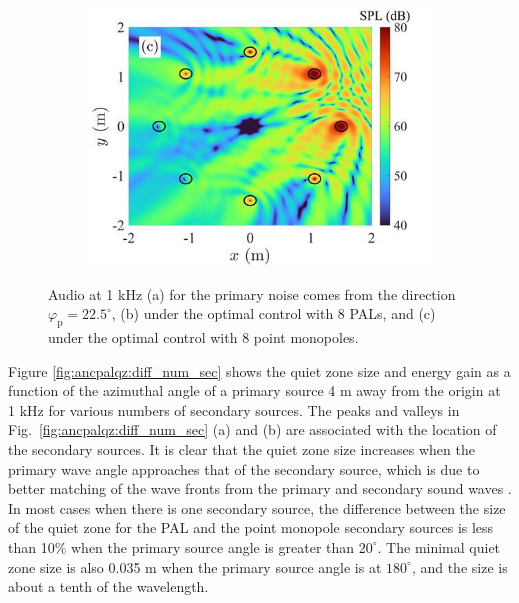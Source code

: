 \begin{figure}[!htb]
\begin{subfigure}{0.32\textwidth}
        \includegraphics[width = \textwidth]{fig/cal_ANC_QuietZone_demo_tot_Monopole_200503B_resize.jpg}
    \end{subfigure}
    \caption{Audio  at 1 kHz (a) for the primary noise comes from the direction $\varphi_{\mathrm{p} }= 22.5^\circ$, (b) under the optimal control with 8 PALs, and (c) under the optimal control with 8 point monopoles.}
    \label{fig:ancpalqz:2d:compare}
\end{figure}


Figure \ref{fig:ancpalqz:diff_num_sec} shows the quiet zone size and energy gain as a function of the azimuthal angle of a primary source 4 m away from the origin at 1 kHz for various numbers of secondary sources. 
The peaks and valleys in Fig.~\ref{fig:ancpalqz:diff_num_sec} (a) and (b) are associated with the location of the secondary sources. 
It is clear that the quiet zone size increases when the primary wave angle approaches that of the secondary source, which is due to better matching of the wave fronts from the primary and secondary sound waves \cite{Guo1997ActivelyCreatedQuiet}.
In most cases when there is one secondary source, the difference between the size of the quiet zone for the PAL and the point monopole secondary sources is less than 10\% when the primary source angle is greater than $20^\circ$. 
The minimal quiet zone size is also 0.035 m when the primary source angle is at $180^\circ$, and the size is about a tenth of the wavelength. 

